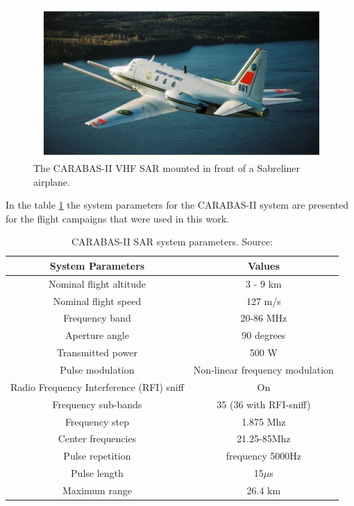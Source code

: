 \begin{figure}[H]
    \centering
    \includegraphics{chapter6/sabreliner.jpg}
    \caption{The CARABAS-II VHF SAR mounted in front of a Sabreliner airplane.}
    \label{fig:sabreliner}
\end{figure}

In the table \ref{tab:carabas_system} the system parameters for the CARABAS-II system are presented for the
flight campaigns that were used in this work. 

\begin{table}[H]
    \centering
    \begin{tabular}{|c|c|}
        \hline
        System Parameters & Values \\ \hline \hline
        Nominal flight altitude & 3 - 9 km \\ \hline
        Nominal flight speed & 127 m/s \\ \hline
        Frequency band & 20-86 MHz \\ \hline
        Aperture angle & 90 degrees \\ \hline
        Transmitted power & 500 W \\ \hline
        Pulse modulation & Non-linear frequency modulation \\ \hline
        Radio Frequency Interference (RFI) sniff & On \\ \hline
        Frequency sub-bands & 35 (36 with RFI-sniff) \\ \hline
        Frequency step & 1.875 Mhz \\ \hline
        Center frequencies & 21.25-85Mhz \\ \hline
        Pulse repetition & frequency 5000Hz \\ \hline
        Pulse length & 15$\mu$s \\ \hline
        Maximum range & 26.4 km \\ \hline
    \end{tabular}
    \caption{CARABAS-II SAR system parameters. Source: \cite{76}}
    \label{tab:carabas_system}
\end{table}


